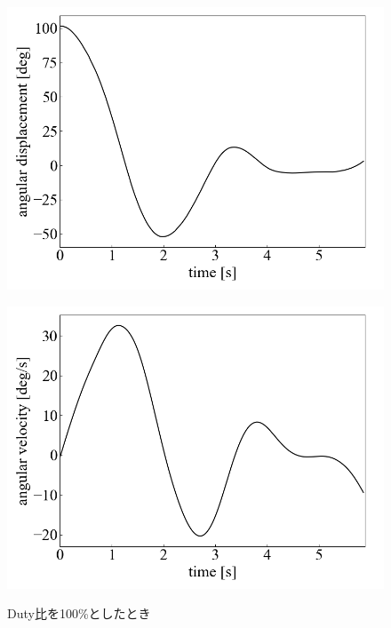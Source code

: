   \begin{figure}[h]
	\centering
	\begin{minipage}{0.43\columnwidth}
	  \centering
	  \includegraphics[width=\columnwidth]{./figure/duty100deg.png}
	  \label{fig:duty100deg}
	\end{minipage}
	\hspace{5mm}
	\begin{minipage}{0.43\columnwidth}
	  \centering
	  \includegraphics[width=\columnwidth]{./figure/duty100degpers.png}
	  \label{fig:duty100degpers}
	\end{minipage}
	\caption{Duty比を100\%としたとき}
  \end{figure}

